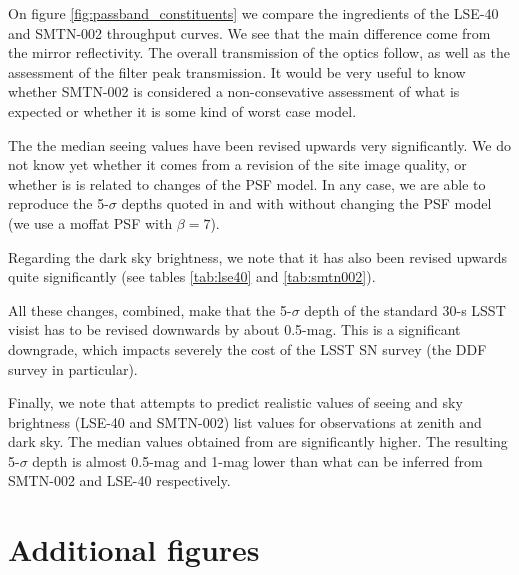 \documentclass[\docopts]{\docclass}
\begin{document}
On figure \ref{fig:passband_constituents} we compare the ingredients
of the LSE-40 and SMTN-002 throughput curves.  We see that the main
difference come from the mirror reflectivity. The overall transmission
of the optics follow, as well as the assessment of the filter peak
transmission.  It would be very useful to know whether SMTN-002 is
considered a non-consevative assessment of what is expected or whether
it is some kind of worst case model.

The the median seeing values have been revised upwards very
significantly. We do not know yet whether it comes from a revision of
the site image quality, or whether is is related to changes of the PSF
model. In any case, we are able to reproduce the 5-$\sigma$ depths
quoted in \cite{LSE-40} and \cite{SMTN-002} with  without
changing the PSF model (we use a moffat PSF with $\beta=7$).

Regarding the dark sky brightness, we note that it has also been
revised upwards quite significantly (see tables \ref{tab:lse40} and
\ref{tab:smtn002}).

All these changes, combined, make that the 5-$\sigma$ depth of the
standard 30-s LSST visist has to be revised downwards by about
0.5-mag. This is a significant downgrade, which impacts severely the
cost of the LSST SN survey (the DDF survey in particular).

Finally, we note that  attempts to predict realistic
values of seeing and sky brightness (LSE-40 and SMTN-002) list values
for observations at zenith and dark sky. The median values obtained
from  are significantly higher. The resulting 5-$\sigma$
depth is almost 0.5-mag and 1-mag lower than what can be inferred from
SMTN-002 and LSE-40 respectively. 



\section{Additional figures}
\end{document}
